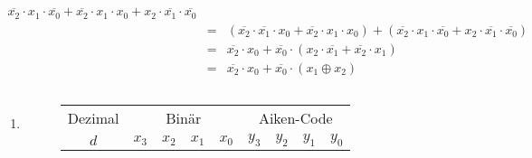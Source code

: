 \documentclass[DIN, pagenumber=false, fontsize=11pt, parskip=half]{scrartcl}
\begin{document}
\begin{enumerate}[label=(\alph*)]
\begin{eqnarray*}
                \overline{x_2} \cdot x_1 \cdot \overline{x_0} +
                \overline{x_2} \cdot x_1 \cdot x_0 +
                x_2 \cdot \overline{x_1} \cdot \overline{x_0} \\
                &=& (\overline{x_2} \cdot \overline{x_1} \cdot x_0 + 
                \overline{x_2} \cdot x_1 \cdot x_0) +
                (\overline{x_2} \cdot x_1 \cdot \overline{x_0} +
                x_2 \cdot \overline{x_1} \cdot \overline{x_0}) \\
                &=& \overline{x_2} \cdot x_0 +
                \overline{x_0} \cdot (x_2 \cdot \overline{x_1} + \overline{x_2} \cdot x_1) \\
                &=& \overline{x_2} \cdot x_0 + \overline{x_0} \cdot (x_1 \oplus x_2)
            \end{eqnarray*}
    \end{enumerate}

    \subsection{}
    \begin{enumerate}[label=(\alph*)]
        \item 
            \begin{figure}[H]
                \centering
                \begin{tabular}{c|cccc|cccc}
                    \toprule
                    Dezimal & \multicolumn{4}{c|}{Binär} & \multicolumn{4}{c}{Aiken-Code} \\
                    $d$ & $x_3$ & $x_2$ & $x_1$ & $x_0$ & $y_3$ & $y_2$ & $y_1$ & $y_0$ \\
                    \midrule

                    \bottomrule
                \end{tabular}
            \end{figure}
    \end{enumerate}
\end{document}
